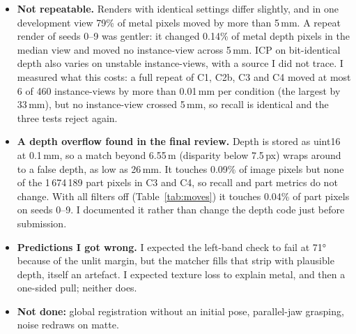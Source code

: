 \documentclass[10pt,a4paper]{article}
\begin{document}
\begin{itemize}
\item \textbf{Not repeatable.} Renders with identical settings differ slightly, and in one development view 79\% of metal pixels moved by more than 5\,mm. A repeat render of seeds 0--9 was gentler: it changed 0.14\% of metal depth pixels in the median view and moved no instance-view across 5\,mm. ICP on bit-identical depth also varies on unstable instance-views, with a source I did not trace. I measured what this costs: a full repeat of C1, C2b, C3 and C4 moved at most 6 of 460 instance-views by more than 0.01\,mm per condition (the largest by 33\,mm), but no instance-view crossed 5\,mm, so recall is identical and the three tests reject again.
\item \textbf{A depth overflow found in the final review.} Depth is stored as uint16 at 0.1\,mm, so a match beyond 6.55\,m (disparity below 7.5\,px) wraps around to a false depth, as low as 26\,mm. It touches 0.09\% of image pixels but none of the 1\,674\,189 part pixels in C3 and C4, so recall and part metrics do not change. With all filters off (Table~\ref{tab:moves}) it touches 0.04\% of part pixels on seeds 0--9. I documented it rather than change the depth code just before submission.
\item \textbf{Predictions I got wrong.} I expected the left-band check to fail at 71° because of the unlit margin, but the matcher fills that strip with plausible depth, itself an artefact. I expected texture loss to explain metal, and then a one-sided pull; neither does.
\item \textbf{Not done:} global registration without an initial pose, parallel-jaw grasping, noise redraws on matte.
\end{itemize}
\end{document}
